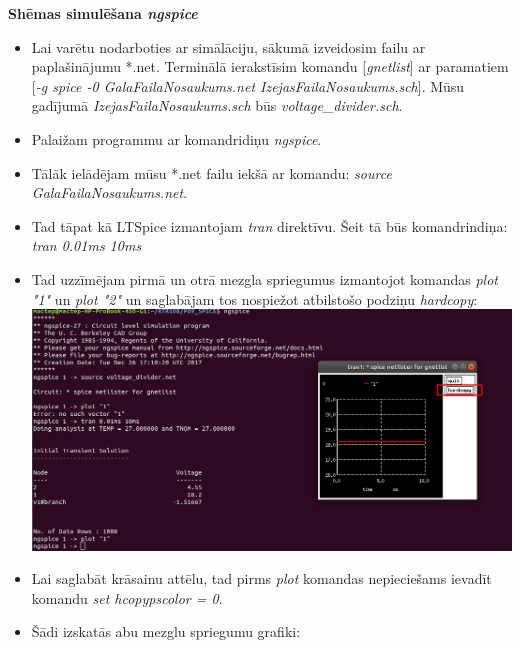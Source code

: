 \documentclass[12pt,a4paper]{report}
\begin{document}
{\large\bfseries Shēmas simulēšana \emph{ngspice}\par}
\begin{itemize}
    \item Lai varētu nodarboties ar simālāciju, sākumā izveidosim failu ar paplašinājumu *.net. Terminālā ierakstīsim komandu [\emph{gnetlist}] ar paramatiem [\emph{-g spice -0 GalaFailaNosaukums.net IzejasFailaNosaukums.sch}]. Mūsu gadījumā \emph{IzejasFailaNosaukums.sch} būs \emph{voltage\_divider.sch}.\\
    \item Palaižam programmu ar komandridiņu \emph{ngspice}.\\
    \item Tālāk ielādējam mūsu *.net failu iekšā ar komandu: \emph{source GalaFailaNosaukums.net}.\\
    \item Tad tāpat kā LTSpice izmantojam \emph{tran} direktīvu. Šeit tā būs komandrindiņa: \emph{tran 0.01ms 10ms}\\
    \item Tad uzzīmējam pirmā un otrā mezgla spriegumus izmantojot komandas \emph{plot "1"} un \emph{plot "2"} un saglabājam tos nospiežot atbilstošo podziņu \emph{hardcopy}:\\
          \includegraphics[scale=0.3]{5}\\
    \item Lai saglabāt krāsainu attēlu, tad pirms \emph{plot} komandas nepieciešams ievadīt komandu \emph{set hcopypscolor = 0}.\\
    \item Šādi izskatās abu mezglu spriegumu grafiki:\\

\end{itemize}
\end{document}
